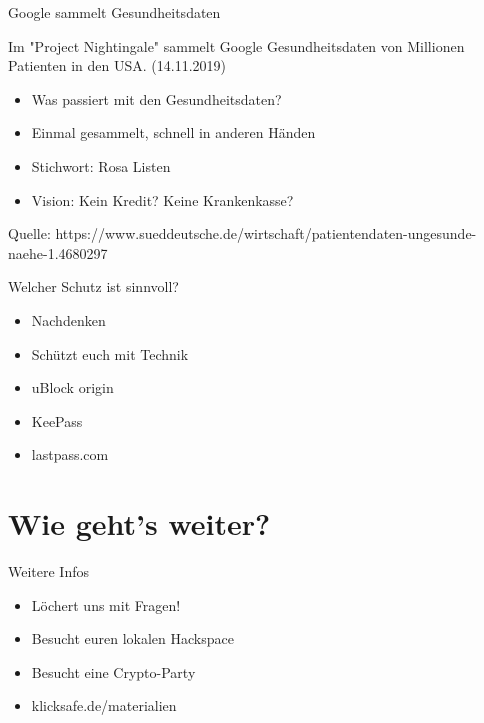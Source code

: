 \documentclass[10pt]{beamer}
\begin{document}
%
%
\begin{frame}[fragile]{Google sammelt Gesundheitsdaten}
      \begin{alertblock}{Im "Project Nightingale" sammelt Google Gesundheitsdaten von Millionen Patienten in den USA. (14.11.2019)}
    \begin{itemize}
    \item Was passiert mit den Gesundheitsdaten?
    \item Einmal gesammelt, schnell in anderen Händen
    \item Stichwort: Rosa Listen
    \item Vision: Kein Kredit? Keine Krankenkasse?
  \end{itemize}
      \end{alertblock}
      \tiny Quelle: https://www.sueddeutsche.de/wirtschaft/patientendaten-ungesunde-naehe-1.4680297
\end{frame}

%
%
\begin{frame}[fragile]{Welcher Schutz ist sinnvoll?}
    \begin{itemize}
    \item Nachdenken
    \item Schützt euch mit Technik
    \item \alert{uBlock origin}
    \item \alert{KeePass}
    \item \alert{lastpass.com}
  \end{itemize}
\end{frame}

\section{Wie geht's weiter?}

%
%
\begin{frame}{Weitere Infos}
\begin{itemize}
    \item Löchert uns mit Fragen!
    \item Besucht euren lokalen Hackspace
    \item Besucht eine Crypto-Party
    \item \alert{klicksafe.de/materialien}
  \end{itemize}
\end{frame}
\end{document}
